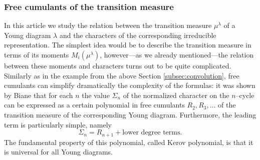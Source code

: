 \documentclass[12pt,dvips]{amsart}
\numberwithin{equation}{section} \numberwithin{figure}{section}
\theoremstyle{plain}
\theoremstyle{definition}
\theoremstyle{remark}
\newcommand{\C}{{\mathbb{C}}}
\newcommand{\R}{{\mathbb{R}}}
\newcommand{\Sn}[1]{{{S}}_{#1}}
\DeclareMathOperator{\Tr}{Tr}
\begin{document}
\subsubsection{Free cumulants of the transition measure}
\label{subsec:kerov}
In this article we study the relation between the transition measure
$\mu^{\lambda}$ of a Young diagram $\lambda$ and the characters of
the corresponding irreducible representation. The simplest idea
would be to describe the transition measure in terms of its moments
$M_i(\mu^{\lambda})$, however---as we already mentioned---the
relation between these moments and characters turns out to be quite
complicated. Similarly as in the example from the above Section
\ref{subsec:convolution}, free cumulants can simplify dramatically
the complexity of the formulas: it was shown by Biane
\cite{Biane1998} that for each $n$ the value $\Sigma_n$ of the
normalized character on the $n$--cycle
can be expressed as a certain polynomial in free cumulants
$R_2,R_3,\dots$ of the transition measure of the corresponding Young
diagram. Furthermore, the leading term is particularly simple,
namely
\begin{equation}
\label{eq:asymptotyka0}
\Sigma_{n}=
R_{n+1} + \text{lower degree terms}.
\end{equation}
The fundamental property of this polynomial, called  Kerov polynomial, is that it is universal for all Young
diagrams.
\end{document}
